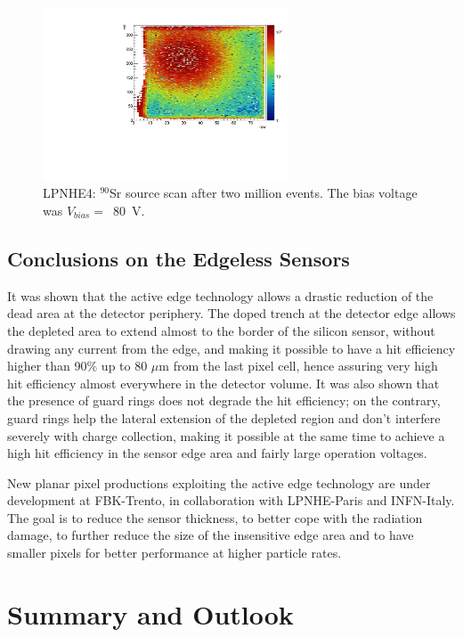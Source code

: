\begin{figure}[!htb]
\centering
\includegraphics[width=0.65\textwidth]{LPNHE4_source_scan.pdf}
\caption{\label{fig:lpnhe4_source_scan}LPNHE4: $^{90}$Sr source scan after two million events. The bias voltage was $V_{bias} = $~80~V.}
\end{figure}

\subsection{Conclusions on the Edgeless Sensors}
It was shown that the active edge technology allows a drastic reduction of the  dead area at the detector periphery. The doped trench at the detector edge allows the depleted area to extend almost to the border of the silicon sensor, without drawing any current from the edge,
and making it possible to have a hit efficiency higher than 90$\%$ up to 80 $\mu$m from the last pixel cell,
hence
assuring very high hit efficiency almost everywhere in the detector volume.
It was also shown that the presence of guard rings does not degrade the hit  efficiency; on the contrary, guard rings help the lateral extension of the depleted region and don't interfere severely with charge collection, making it possible at the same time to achieve a high hit efficiency in the sensor edge area and fairly large operation voltages.

New planar pixel productions exploiting the active edge technology are under development at FBK-Trento, in collaboration with LPNHE-Paris and INFN-Italy. The goal is to reduce the sensor thickness, to better cope with the radiation damage, to further reduce the size of the insensitive edge area and to have smaller pixels for better performance at higher particle rates.

\section{Summary and Outlook}
\label{sec:itksummary}

